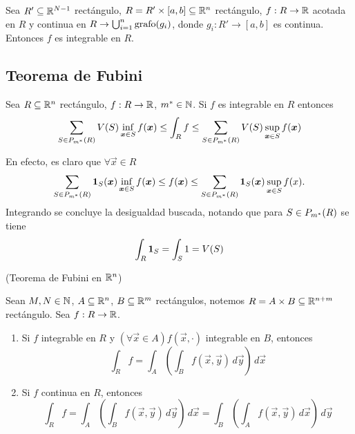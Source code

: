 \begin{corolario}
Sea $ R' \subseteq \mathbb{R}^{N-1}$ rect\'angulo, $ R = R' \times [a,b] \subseteq \mathbb{R}^n $ rect\'angulo, $ f:R \to \mathbb{R} $ acotada en $ R $ y continua en $ R \rightarrow \bigcup_{i=1}^n\operatorname{grafo}(g_i) $, donde $ g_i: R' \to [a,b] $ es continua. Entonces $ f $ es integrable en $ R $.
\end{corolario}

\subsection{Teorema de Fubini}

\begin{lema}\label{lem:estimacion2}
Sea $ R \subseteq \mathbb{R}^n $ rect\'angulo, $f : R \to \mathbb{R}$, $m^*\in \mathbb{N}$. Si $ f $ es integrable en $ R $ entonces
    \[ \sum_{S \in P_{m^*}(R)} V(S) \inf_{\boldsymbol{x} \in S} f(\boldsymbol{x}) \leq \int_R f \leq \sum_{S \in P_{m^*}(R)} V(S) \sup_{\boldsymbol{x} \in S} f(\boldsymbol{x})\]
\end{lema}


\begin{demostracion}
En efecto, es claro que $ \forall \vec{x} \in R $
\[
    \sum_{S \in P_{m^*}(R)} \mathbf{1}_{S}(\boldsymbol{x}) \inf_{\boldsymbol{x} \in S} f(\boldsymbol{x}) \leq f(\boldsymbol{x})
        \leq \sum_{S \in P_{m^*}(R)} \mathbf{1}_{S}(\boldsymbol{x}) \sup_{\boldsymbol{x} \in S} f(x).
\]
Integrando se concluye la desigualdad buscada, notando que para $S \in P_{m^*}(R) $ se tiene
\[
    \int_R \mathbf{1}_{S} = \int_S 1 = V(S)
\]

\end{demostracion}

\begin{teorema}{\rm (Teorema de Fubini en $\mathbb{R}^n$)} \label{teo:FubiniRN}

Sean $M,N\in \mathbb{N}$, $ A \subseteq \mathbb{R}^n $, $ B \subseteq \mathbb{R}^m $ rect\'angulos, notemos $ R = A \times B \subseteq \mathbb{R}^{n+m} $ rect\'angulo. Sea $f: R \to \mathbb{R}$.
\begin{enumerate}
    \item Si $ f $ integrable en $ R $ y $ (\forall \vec{x} \in A)
    f(\vec{x}, \cdot) $ integrable en $ B $, entonces
        \[ \int_R f = \int_A\left(\int_B f(\vec{x},\vec{y}) \, d\vec{y}\right)\, d\vec{x}\]
    \item Si $ f $ continua en $ R $, entonces
        \[ \int_R f = \int_A\left(\int_B f(\vec{x},\vec{y})\,d\vec{y}\right)\,d\vec{x}
        = \int_B\left(\int_A f(\vec{x},\vec{y})\,d\vec{x}\right)\,d\vec{y} \]
\end{enumerate}
\end{teorema}

